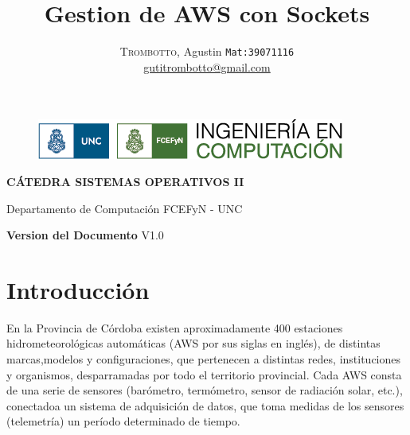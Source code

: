 \documentclass[10pt, a4paper,notitlepage]{article}
\newcommand{\HRule}{\rule{\linewidth}{0.5mm}} %
\begin{document}
 \begin{figure}[H] 
 	\centering
 	\includegraphics[scale=0.9]{./imagenes/logo_facu.png}
\end{figure}
{\center
	\huge
	\textbf{CÁTEDRA SISTEMAS OPERATIVOS II\\}}

{\center
	\Large{Departamento de Computación	FCEFyN - UNC\\}}

\title{%
		{ \bfseries{ Gestion de AWS con Sockets}}\\[0.4cm]
		} %
\author{
\textsc{Trombotto}, Agustin  {\small \texttt{Mat:39071116}}\\
\href{mailto:gutitrombotto@gmail.com}{gutitrombotto@gmail.com}\\
}

{\let\newpage\relax\maketitle}


{\center
\textbf{Version del Documento} V1.0\\}
\clearpage

\section{Introducción}
En la Provincia de Córdoba existen aproximadamente 400 estaciones hidrometeorológicas automáticas (AWS por sus siglas en inglés), de distintas marcas,modelos y configuraciones, que pertenecen a distintas redes, instituciones y organismos, desparramadas por todo el territorio provincial. Cada AWS consta de una
serie de sensores (barómetro, termómetro, sensor de radiación solar, etc.), conectadoa un sistema de adquisición de datos, que toma medidas de los sensores (telemetría) un período determinado de tiempo.
\end{document}
